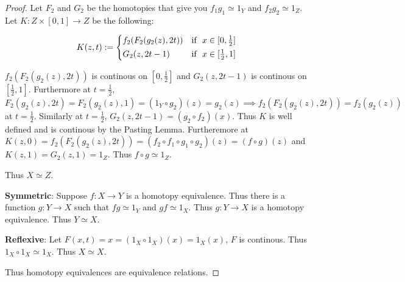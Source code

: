 \documentclass{article}
\begin{document}
\begin{proof}
    Let $F_2$ and $G_2$ be the homotopies that give you $f_1 g_1 \simeq 1_Y$ and $f_2 g_2 \simeq 1_Z$. Let $K: Z \times [0, 1] \to Z$ be the following:
    
    \begin{equation*}
        K(z, t) := \begin{cases*}
            f_2(F_2(g_2(z), 2t)) & \text{if } $x \in [0, \frac{1}{2}]$ \\
            G_2(z, 2t - 1) & \text{if } $x \in [\frac{1}{2}, 1]$
        \end{cases*}
    \end{equation*}
    
    $f_2(F_2(g_2(z), 2t))$ is continous on $[0, \frac{1}{2}]$ and $G_2(z, 2t - 1)$ is continous on $[\frac{1}{2}, 1]$. Furthermore at $t = \frac{1}{2}$, $F_2(g_2(z), 2t) = F_2(g_2(z), 1) = (1_Y \circ g_2)(z) = g_2(z) \implies f_2(F_2(g_2(z), 2t)) = f_2(g_2(z))$ at $t = \frac{1}{2}$. Similarly at $t = \frac{1}{2}$, $G_2(z, 2t - 1) = (g_2 \circ f_2)(x)$. Thus $K$ is well defined and is continous by the Pasting Lemma. Furtheremore at $K(z, 0) = f_2(F_2(g_2(z), 2t)) = (f_2 \circ f_1 \circ g_1 \circ g_2)(z) = (f \circ g)(z)$ and $K(z, 1) = G_2(z, 1) = 1_Z$. Thus $f \circ g \simeq 1_Z$.
    
    Thus $X \simeq Z$.  

    
    \textbf{Symmetric}: Suppose $f: X \to Y$ is a homotopy equivalence. Thus there is a function $g: Y \to X$ such that $fg \simeq 1_Y$ and $gf \simeq 1_X$. Thus $g: Y \to X$ is a homotopy equivalence. Thus $Y \simeq X$. 
    
    \textbf{Reflexive}: Let $F(x, t) = x = (1_X \circ 1_X)(x) = 1_X(x)$, $F$ is continous. Thus $1_X \circ 1_X \simeq 1_X$. Thus $X \simeq X$. 
    
    Thus homotopy equivalences are equivalence relations. 
\end{proof}
\end{document}
